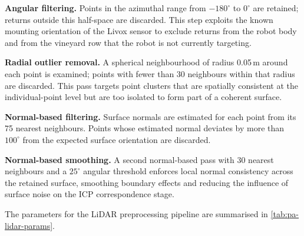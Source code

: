 \textbf{Angular filtering.} Points in the azimuthal range from $-180^{\circ}$ to $0^{\circ}$ are retained; returns outside this half-space are discarded.
This step exploits the known mounting orientation of the Livox sensor to exclude returns from the robot body and from the vineyard row that the robot is not currently targeting.

\textbf{Radial outlier removal.} A spherical neighbourhood of radius 0.05\,m around each point is examined; points with fewer than 30 neighbours within that radius are discarded.
This pass targets point clusters that are spatially consistent at the individual-point level but are too isolated to form part of a coherent surface.

\textbf{Normal-based filtering.} Surface normals are estimated for each point from its 75 nearest neighbours. Points whose estimated normal deviates by more than $100^{\circ}$ from the expected surface orientation are discarded.

\textbf{Normal-based smoothing.} A second normal-based pass with 30 nearest neighbours and a $25^{\circ}$ angular threshold enforces local normal consistency across the retained surface, smoothing boundary effects and reducing the influence of surface noise on the ICP correspondence stage.

The parameters for the LiDAR preprocessing pipeline are summarised in \cref{tab:pa-lidar-params}.

